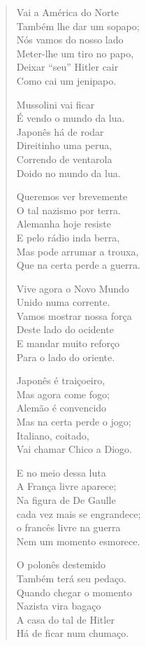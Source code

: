 \begin{verse}
Vai a América do Norte\\
Também lhe dar um sopapo;\\
Nós vamos do nosso lado\\
Meter-lhe um tiro no papo,\\
Deixar “seu” Hitler cair\\
Como cai um jenipapo.

Mussolini vai ficar\\
É vendo o mundo da lua.\\
Japonês há de rodar\\
Direitinho uma perua,\\
Correndo de ventarola\\
Doido no mundo da lua.

Queremos ver brevemente\\
O tal nazismo por terra.\\
Alemanha hoje resiste\\
E pelo rádio inda berra,\\
Mas pode arrumar a trouxa,\\
Que na certa perde a guerra.


Vive agora o Novo Mundo\\
Unido numa corrente.\\
Vamos mostrar nossa força\\
Deste lado do ocidente\\
E mandar muito reforço\\
Para o lado do oriente.

Japonês é traiçoeiro,\\
Mas agora come fogo;\\
Alemão é convencido\\
Mas na certa perde o jogo;\\
Italiano, coitado,\\
Vai chamar Chico a Diogo.

E no meio dessa luta\\
A França livre aparece;\\
Na figura de De Gaulle\\
cada vez mais se engrandece;\\
o francês livre na guerra\\
Nem um momento esmorece.

O polonês destemido\\
Também terá seu pedaço.\\
Quando chegar o momento\\
Nazista vira bagaço\\
A casa do tal de Hitler\\
Há de ficar num chumaço.



\end{verse}
